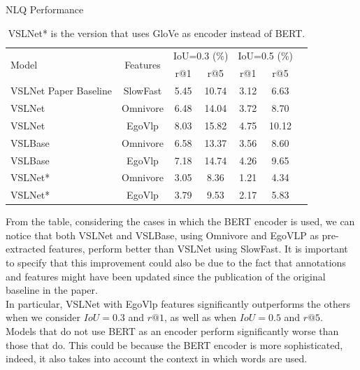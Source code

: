 \documentclass[conference]{IEEEtran}
\begin{document}
\begin{table}[h]
\centering
\caption{NLQ Performance}
\label{tab:performance}
\begin{tabular}{@{}lcccccc@{}}
\toprule
\multirow{2}{*}{Model} & \multirow{2}{*}{Features} & \multicolumn{2}{c}{IoU=0.3 (\%)} & \multicolumn{2}{c}{IoU=0.5 (\%)} \\ 
& & r@1  & r@5 & r@1   & r@5       \\ \midrule
VSLNet Paper Baseline & SlowFast & 5.45 & 10.74 & 3.12 & 6.63 \\ 
VSLNet & Omnivore & 6.48 & 14.04 & 3.72 & 8.70 \\ 
VSLNet & EgoVlp & 8.03 & 15.82 & 4.75 & 10.12 \\ 
VSLBase & Omnivore & 6.58 & 13.37 & 3.56 & 8.60 \\
VSLBase & EgoVlp & 7.18 & 14.74 & 4.26 & 9.65 \\
VSLNet* & Omnivore & 3.05 & 8.36 & 1.21 & 4.34 \\
VSLNet* & EgoVlp & 3.79 & 9.53 & 2.17 & 5.83 \\
\bottomrule
\end{tabular}
\captionsetup{font=footnotesize}
\caption*{VSLNet* is the version that uses GloVe as encoder instead of BERT.}
\end{table}
From the table, considering the cases in which the BERT encoder is used, we can notice that both VSLNet and VSLBase, using Omnivore and EgoVLP as pre-extracted features, perform better than VSLNet using SlowFast. It is important to specify that this improvement could also be due to the fact that annotations and features might have been updated since the publication of the original baseline in the paper.
\\
In particular, VSLNet with EgoVlp features significantly outperforms the others when we consider $IoU = 0.3$ and $r@1$, as well as when $IoU = 0.5$ and $r@5$.
\\
Models that do not use BERT as an encoder perform significantly worse than those that do. This could be because the BERT encoder is more sophisticated, indeed, it also takes into account the context in which words are used.
\end{document}
